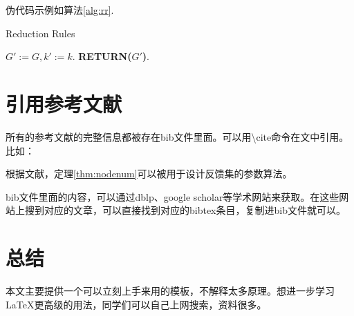 \documentclass{ctexart}
\begin{document}
伪代码示例如算法\ref{alg:rr}.

\begin{algorithm}[H]
	\caption{Reduction Rules}
	\label{alg:rr}
	$G':= G,k':=k$.
	\textbf{RETURN($G'$)}.
\end{algorithm}

\section{引用参考文献}
所有的参考文献的完整信息都被存在bib文件里面。可以用\textbackslash cite命令在文中引用。比如：

根据文献\cite{cygan2015parameterized}，定理\ref{thm:nodenum}可以被用于设计反馈集的参数算法。

bib文件里面的内容，可以通过dblp、google scholar等学术网站来获取。在这些网站上搜到对应的文章，可以直接找到对应的bibtex条目，复制进bib文件就可以。

\section{总结}
本文主要提供一个可以立刻上手来用的模板，不解释太多原理。想进一步学习LaTeX更高级的用法，同学们可以自己上网搜索，资料很多。



\end{document}
